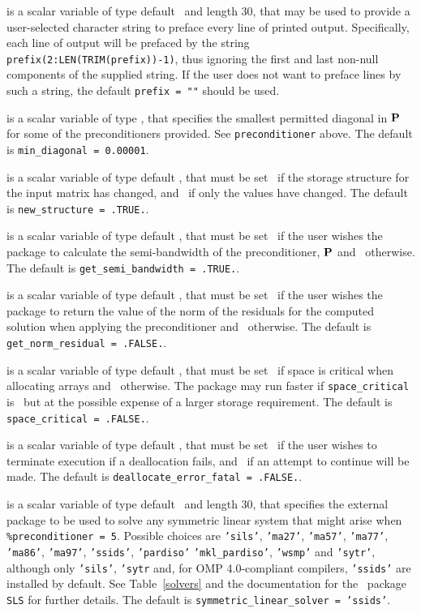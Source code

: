 \documentclass{galahad}
\begin{document}
\begin{description}
 is a scalar variable of type default \character\
and length 30, that may be used to provide a user-selected
character string to preface every line of printed output.
Specifically, each line of output will be prefaced by the string
{\tt prefix(2:LEN(TRIM(prefix))-1)},
thus ignoring the first and last non-null components of the
supplied string. If the user does not want to preface lines by such
a string, the default {\tt prefix = ""} should be used.

 is a scalar variable of type \realdp,
that specifies the smallest permitted diagonal in ${\mathbf{P}}$ for some
of the preconditioners provided. See {\tt preconditioner} above.
The default is {\tt min\_diagonal = 0.00001}.

 is a scalar variable of type default \logical,
that must be set \true\ if the storage structure for the input matrix has
changed, and \false\ if only the values have changed.
The default is {\tt new\_structure = .TRUE.}.

 is a scalar variable of type default \logical,
that must be set \true\ if the user wishes the package to calculate
the semi-bandwidth of the preconditioner, ${\mathbf{P}}$
and  \false\ otherwise.
The default is {\tt get\_semi\_bandwidth = .TRUE.}.

 is a scalar variable of type default \logical,
that must be set \true\ if the user wishes the package to return
the value of the norm of the residuals for the computed solution
when applying the preconditioner and  \false\ otherwise.
The default is {\tt get\_norm\_residual = .FALSE.}.

 is a scalar variable of type default \logical,
that must be set \true\ if space is critical when allocating arrays
and  \false\ otherwise. The package may run faster if
{\tt space\_critical} is \false\ but at the possible expense of a larger
storage requirement. The default is {\tt space\_critical = .FALSE.}.

 is a scalar variable of type default \logical,
that must be set \true\ if the user wishes to terminate execution if
a deallocation  fails, and \false\ if an attempt to continue
will be made. The default is {\tt deallocate\_error\_fatal = .FALSE.}.

 is a scalar variable of type default \character\
and length 30, that specifies the external package to be used to
solve any symmetric linear system that might arise
when {\tt \%precondit\-ioner = 5}. Possible choices are
{\tt 'sils'},
{\tt 'ma27'},
{\tt 'ma57'},
{\tt 'ma77'},
{\tt 'ma86'},
{\tt 'ma97'},
{\tt 'ssids'},
{\tt 'pardiso'}
{\tt 'mkl\_pardiso'},
{\tt 'wsmp'} and
{\tt 'sytr'},
although only {\tt 'sils'}, {\tt 'sytr} and, for OMP 4.0-compliant compilers,
{\tt 'ssids'} are installed by default.
See Table~\ref{solvers} and
the documentation for the \galahad\ package {\tt SLS} for further details.
The default is {\tt symmetric\_linear\_solver = 'ssids'}.


\end{description}
\end{document}
